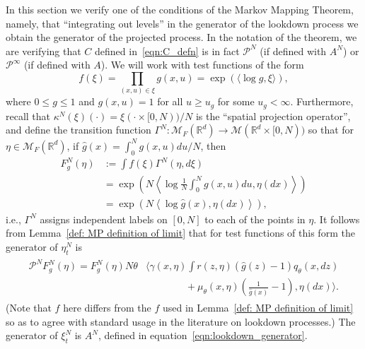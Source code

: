 \documentclass[12pt]{article}
\def \hat{\widehat}
\newcommand{\IR}{\mathbb R}
\newcommand{\Pgen}{\mathcal{P}}    %
\newcommand{\lp}{\xi}              %
\newcommand{\measures}{\mathcal{M}_F(\IR^d)} %
\numberwithin{equation}{section}
\begin{document}
In this section we verify one of the conditions of the Markov Mapping Theorem,
namely, that ``integrating out levels'' in the generator of the lookdown process
we obtain the generator of the projected process.
In the notation of the theorem,
we are verifying that $C$ defined in~\eqref{eqn:C_defn} is in fact $\Pgen^N$
(if defined with $A^N$) or $\Pgen^\infty$ (if defined with $A$).
We will work with test functions of the form
\begin{equation} \label{eqn:f_defn}
    f(\lp) = \prod_{(x, u) \in \lp} g(x, u) = \exp\left(\langle \log g, \lp \rangle \right) ,
\end{equation}
where $0 \le g \le 1$ and $g(x,u) = 1$ for all $u \ge u_g$ for some $u_g < \infty$.
Furthermore, recall that $\kappa^N(\lp)(\cdot) = \lp(\cdot \times [0, N)) / N$
is the ``spatial projection operator'',
and define the transition function $\Gamma^N : \measures \to \mathcal{M}(\IR^d \times [0,N))$
so that for $\eta \in \measures$, if $\hat g(x) = \int_0^N g(x, u) du / N$, then
\begin{align*}
    F^N_g(\eta)
    &:=
    \int f(\lp) \Gamma^N(\eta, d\lp) \\
    &=
    \exp\left(
        N \left\langle
            \log \frac{1}{N} \int_0^N g(x, u) du, \eta(dx)
        \right\rangle
    \right) \\
    &=
    \exp\left(
        N \left\langle \log \hat g(x), \eta(dx) \right\rangle
    \right) ,
\end{align*}
i.e., $\Gamma^N$ assigns independent labels on $[0, N]$ to each of the points in $\eta$.
It follows from Lemma~\ref{def: MP definition of limit} that for test functions of this form
the generator of $\eta^N_t$ is
\begin{align} \label{eqn:pgen_defn_again}
    \begin{split}
    \Pgen^N F^N_g(\eta)
    =
    F^N_g(\eta)
        N \theta & \bigg\langle
        \gamma(x, \eta) \int r(z, \eta) \left( \hat g(z) - 1 \right) q_\theta(x, dz)
    \\ &\qquad \qquad {}
        +
        \mu_\theta(x, \eta) \left( \frac{1}{\hat g(x)} - 1 \right)
        ,
        \eta(dx)
    \bigg\rangle .
    \end{split}
\end{align}
(Note that $f$ here differs from the $f$ used in Lemma~\ref{def: MP definition of limit}
so as to agree with standard usage in the literature on lookdown processes.)
The generator of $\lp^N_t$ is $A^N$, defined in equation~\eqref{eqn:lookdown_generator}.
\end{document}
